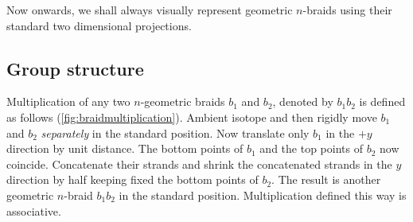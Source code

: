 Now onwards, we shall always visually represent geometric \(n\)-braids using their standard two dimensional projections.

\subsection{Group structure}

Multiplication of any two \(n\)-geometric braids \(b_1\) and \(b_2\), denoted by \(b_1 b_2\) is defined as follows (\cref{fig:braidmultiplication}). Ambient isotope and then rigidly move \(b_1\) and \(b_2\) \textit{separately} in the standard position. Now translate only \(b_1\) in the \(+y\) direction by unit distance. The bottom points of \(b_1\) and the top points of \(b_2\) now coincide. Concatenate their strands and shrink the concatenated strands in the \(y\) direction by half keeping fixed the bottom points of \(b_2\). The result is another geometric \(n\)-braid \(b_1 b_2\) in the standard position. Multiplication defined this way is associative.

